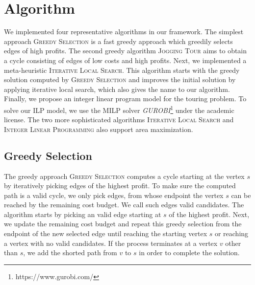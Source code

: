 \documentclass[sigconf,natbib=false]{acmart}
\newcommand{\greedy}{\textsc{Greedy Selection}\xspace}
\newcommand{\jogging}{\textsc{Jogging Tour}\xspace}
\newcommand{\ils}{\textsc{Iterative Local Search}\xspace}
\newcommand{\ilp}{\textsc{Integer Linear Programming}\xspace}
\begin{document}
\section{Algorithm}
\label{sec:algo}
We implemented four representative algorithms in our framework. The simplest approach \greedy is a fast greedy approach which greedily selects edges of high profits.
The second greedy algorithm \jogging aims to obtain a cycle consisting of edges of low costs and high profits.  
Next, we implemented a meta-heuristic \ils. 
This algorithm starts with the greedy solution computed by \greedy and improves the initial solution by applying iterative local search, which also gives the name to our algorithm.
Finally, we propose an integer linear program model for the touring problem. 
To solve our ILP model, we use the MILP solver \emph{GUROBI}\footnote{https://www.gurobi.com/} under the academic license. 
The two more sophisticated algorithms \ils and \ilp also support area maximization. 


%
\subsection{Greedy Selection}

The greedy approach \greedy computes a cycle starting at the vertex $s$ by iteratively picking edges of the highest profit. To make sure the computed path is a valid cycle, we only pick edges, from whose endpoint the vertex $s$ can be reached by the remaining cost budget. 
We call such edges valid candidates. 
The algorithm starts by picking an valid edge starting at $s$ of the highest profit. 
Next, we update the remaining cost budget and repeat this greedy selection from the endpoint of the new selected edge until reaching the starting vertex $s$ or reaching a vertex with no valid candidates. 
If the process terminates at a vertex $v$ other than $s$, we add the shorted path from $v$ to $s$ in order to complete the solution. 
\end{document}
